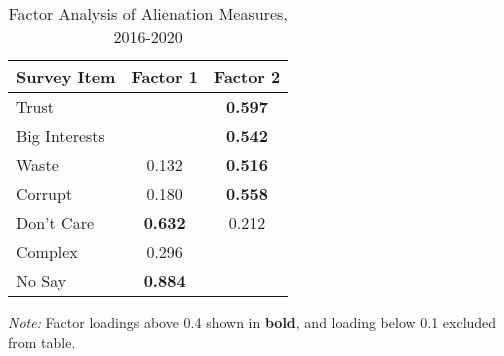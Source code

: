 \begin{table}[ht!]
\caption{Factor Analysis of Alienation Measures, 2016-2020}\vspace{-1em}
\begin{center}
\label{tab:fa-1620}
\begin{threeparttable}
\begin{tabular}{lcc}
\hline
Survey Item   & Factor 1    	   & Factor 2       \\ \hline
Trust         &                & \textbf{0.597} \\
Big Interests &                & \textbf{0.542} \\
Waste         & 0.132          & \textbf{0.516} \\
Corrupt 	  & 0.180          & \textbf{0.558} \\
Don't Care    & \textbf{0.632} & 0.212 			\\
Complex       & 0.296          & 				\\
No Say        & \textbf{0.884} & 				\\
\hline
\end{tabular}
\begin{tablenotes}[flushleft]
\linespread{1}
	\scriptsize
	\item \textit{Note:} Factor loadings above 0.4 shown in \textbf{bold}, and loading below 0.1 excluded from table.\end{tablenotes}
\end{threeparttable}
\end{center}
\end{table}